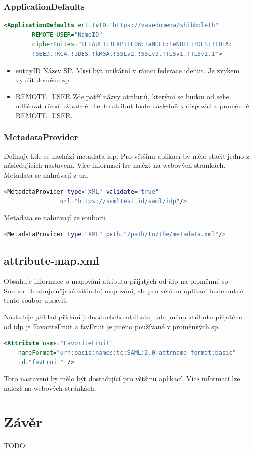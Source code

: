 \subsection{ApplicationDefaults}
\begin{lstlisting}[language=xml]
<ApplicationDefaults entityID="https://vasedomena/shibboleth"
        REMOTE_USER="NameID"
        cipherSuites="DEFAULT:!EXP:!LOW:!aNULL:!eNULL:!DES:!IDEA:
        !SEED:!RC4:!3DES:!kRSA:!SSLv2:!SSLv3:!TLSv1:!TLSv1.1">
\end{lstlisting}
\begin{itemize}
    \item entityID \linebreak
    Název SP. Musí být unikátní v rámci federace identit. Je zvykem využít doménu sp.  
    \item REMOTE\_USER \linebreak
    Zde patří názvy atributů, kterými se budou od sebe odlišovat různí uživatelé. 
    Tento atribut bude následně k dispozici z proměnné REMOTE\_USER.
\end{itemize}
\subsection{MetadataProvider}
Definuje kde se nachází metadata idp. Pro většinu aplikací by mělo stačit jedno z následujících nastavení. Více informací lze nalézt na webových stránkách\cite{MetadataProvider}.
\linebreak \linebreak
Metadata se nahrávají z url.
\begin{lstlisting}[language=Bash]
 <MetadataProvider type="XML" validate="true"
                url="https://samltest.id/saml/idp"/>
\end{lstlisting}
Metadata se nahrávají ze souboru.
\begin{lstlisting}[language=Bash]
 <MetadataProvider type="XML" path="/path/to/the/metadata.xml"/>
\end{lstlisting}


\section{attribute-map.xml}
Obsahuje informace o mapování atributů přijatých od idp na proměnné sp. Soubor obsahuje nějaké základní mapování, ale pro většinu aplikací bude nutné tento soubor upravit.

Následuje příklad přidání jednoduchého atributu, kde jméno atributu přijatého od idp je FavoriteFruit a favFruit je jméno používané v proměnných sp\cite{AddAttribute}.
 \begin{lstlisting}[language=XML]
     <Attribute name="FavoriteFruit"
    nameFormat="urn:oasis:names:tc:SAML:2.0:attrname-format:basic"
    id="favFruit" />
    \end{lstlisting}
    
Toto nastavení by mělo být dostačující pro většinu aplikací. Více informací lze nalézt na webových stránkách\cite{AddAttribute}.

\chapter{Závěr}
TODO:
\label{zaver}






